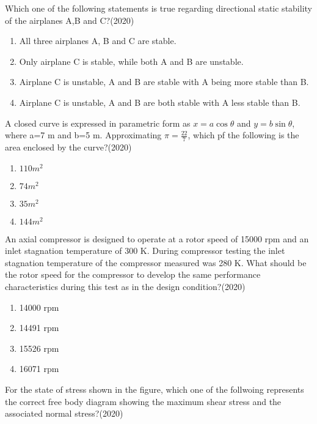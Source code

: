     Which one of the following statements is true regarding directional static stability of the airplanes A,B and C?\hfill (2020)
    \begin{enumerate}[label=(\Alph*)]
        \item All three airplanes A, B and C are stable.
        \item Only airplane C is stable, while both A and B are unstable.
        \item Airplane C is unstable, A and B are stable with A being more stable than B.
        \item Airplane C is unstable, A and B are both stable with A less stable than B.
    \end{enumerate}
    \item A closed curve is expressed in parametric form as $x =a\cos\theta$ and $y=b\sin\theta$, where a=7 m and b=5 m. Approximating $\pi = \frac{22}{7}$, which pf the following is the area enclosed by the curve?\hfill (2020)
    \begin{enumerate}[label=(\Alph*)]
        \item $110 m^2$
        \item $74 m^2$
        \item $35 m^2$
        \item $144 m^2$
    \end{enumerate}
    \item An axial compressor is designed to operate at a rotor speed of 15000 rpm and an inlet stagnation temperature of 300 K. During compressor testing the inlet stagnation temperature of the compressor  measured was 280 K. What should be the rotor speed for the compressor to develop the same performance characteristics during this test as in the design condition?\hfill (2020)
    \begin{enumerate}
        \item 14000 rpm
        \item 14491 rpm
        \item 15526 rpm 
        \item 16071 rpm
    \end{enumerate} 
    \item For the state of stress shown in the figure, which one of the follwoing represents the correct free body diagram showing the maximum shear stress and the associated normal stress?\hfill (2020)
